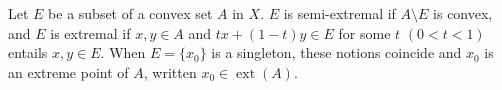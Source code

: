 Let $E$ be a subset of a convex set $A$ in $X$. $E$ is semi-extremal if $A \setminus E$ is convex, and $E$ is extremal if $x, y \in A$ and $tx + (1-t)y \in E$ for some $t$ $(0 < t < 1)$ entails $x, y \in E$. When $E = \{x_0\}$ is a singleton, these notions coincide and $x_0$ is an extreme point of $A$, written $x_0 \in \operatorname{ext}(A)$.